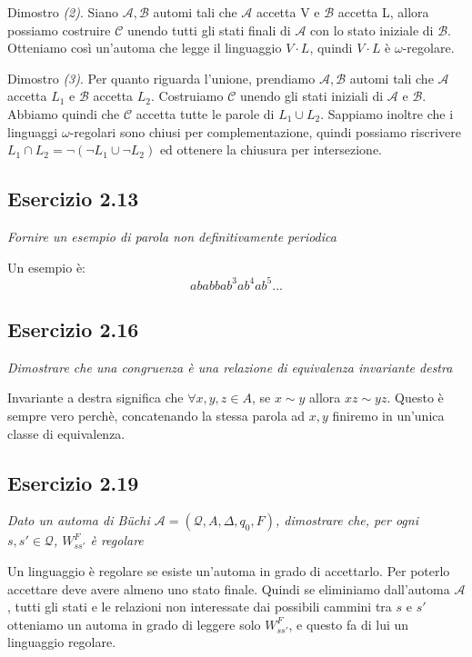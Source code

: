 \documentclass[12pt]{article}
\newcommand{\A}{\ensuremath{\mathcal{A}}\xspace}
\newcommand{\Buchi}{\ensuremath{\mathcal{A} = (\mathcal{Q},A,\Delta,q_0,F)}\xspace}
\newcommand{\buchi}{B\"uchi }
\begin{document}
Dimostro \textit{(2)}. Siano $\mathcal{A}, \mathcal{B}$ automi tali che $\mathcal{A}$ accetta V e $\mathcal{B}$ accetta L, allora possiamo costruire $\mathcal{C}$ unendo tutti gli stati finali di $\mathcal{A}$ con lo stato iniziale di $\mathcal{B}$. Otteniamo così un'automa che legge il linguaggio $V\cdot L$, quindi $V \cdot L$ è $\omega$-regolare.

Dimostro \textit{(3)}. Per quanto riguarda l'unione, prendiamo $\mathcal{A}, \mathcal{B}$ automi tali che $\mathcal{A}$ accetta $L_1$ e $\mathcal{B}$ accetta $L_2$. Costruiamo $\mathcal{C}$ unendo gli stati iniziali di $\mathcal{A}$ e $\mathcal{B}$. Abbiamo quindi che $\mathcal{C}$ accetta tutte le parole di $L_1 \cup L_2$. Sappiamo inoltre che i linguaggi $\omega$-regolari sono chiusi per complementazione, quindi possiamo riscrivere $L_1 \cap L_2 = \neg (\neg L_1 \cup \neg L_2)$ ed ottenere la chiusura per intersezione.

\subsection*{Esercizio 2.13}
\textit{Fornire un esempio di parola non definitivamente periodica}

Un esempio è: $$ ababbab^3ab^4ab^5...$$


\subsection*{Esercizio 2.16}
\textit{Dimostrare che una congruenza è una relazione di equivalenza invariante destra}

Invariante a destra significa che $\forall x,y,z \in A$, se $x \sim y$ allora $xz \sim yz$. Questo è sempre vero perchè, concatenando la stessa parola ad $x,y$ finiremo in un'unica classe di equivalenza.

\subsection*{Esercizio 2.19}
\textit{Dato un automa di \buchi $\Buchi$, dimostrare che, per ogni $s,s' \in \mathcal{Q}$, $W^F_{ss'}$ è regolare}

Un linguaggio è regolare se esiste un'automa in grado di accettarlo. Per poterlo accettare deve avere almeno uno stato finale. Quindi se eliminiamo dall'automa \A, tutti gli stati e le relazioni non interessate dai possibili cammini tra $s$ e $s'$ otteniamo un automa in grado di leggere solo $W^F_{ss'}$, e questo fa di lui un linguaggio regolare.
\end{document}
